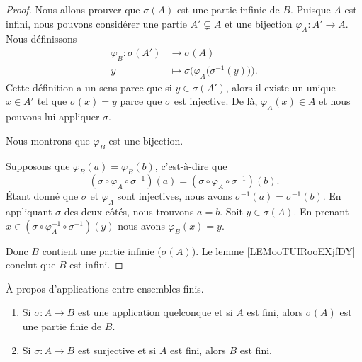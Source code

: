 \begin{proof}
	Nous allons prouver que \( \sigma(A)\) est une partie infinie de \( B\). Puisque \( A\) est infini, nous pouvons considérer une partie \( A'\subsetneq A\) et une bijection \( \varphi_A\colon A'\to A\). Nous définissons
	\begin{equation}
		\begin{aligned}
			\varphi_B\colon \sigma(A') & \to \sigma(A)                                                   \\
			y                          & \mapsto \sigma\Big( \varphi_A\big( \sigma^{-1}(y) \big)  \Big).
		\end{aligned}
	\end{equation}
	Cette définition a un sens parce que si \( y\in \sigma(A')\), alors il existe un unique \( x\in A'\) tel que \( \sigma(x)=y\) parce que \( \sigma\) est injective. De là, \( \varphi_A(x)\in A\) et nous pouvons lui appliquer \( \sigma\).

	Nous montrons que \( \varphi_B\) est une bijection.
	\begin{subproof}
		\spitem[Injective]
		Supposons que \( \varphi_B(a)=\varphi_B(b)\), c'est-à-dire que
		\begin{equation}
			(\sigma\circ\varphi_A\circ\sigma^{-1})(a)=(\sigma\circ\varphi_A\circ\sigma^{-1})(b).
		\end{equation}
		Étant donné que \( \sigma\) et \( \varphi_A\) sont injectives, nous avons \( \sigma^{-1}(a)=\sigma^{-1}(b)\). En appliquant \( \sigma\) des deux côtés, nous trouvons \( a=b\).
		\spitem[surjective]
		Soit \( y\in \sigma(A)\). En prenant \( x\in(\sigma\circ\varphi_A^{-1}\circ\sigma^{-1})(y)\) nous avons \( \varphi_B(x)=y\).
	\end{subproof}
	Donc \( B\) contient une partie infinie (\( \sigma(A)\)). Le lemme \ref{LEMooTUIRooEXjfDY} conclut que \( B\) est infini.
\end{proof}

\begin{lemma}       \label{LEMooPGPVooZzlFvf}
	À propos d'applications entre ensembles finis.
	\begin{enumerate}
		\item       \label{ITEMooNCCUooBGrtdn}
		      Si \( \sigma\colon A\to B\) est une application quelconque et si \( A\) est fini, alors \( \sigma(A)\) est une partie finie de \( B\).
		\item       \label{ITEMooKQMFooSzmXrd}
		      Si \( \sigma\colon A\to B\) est surjective et si \( A\) est fini, alors \( B\) est fini.
	\end{enumerate}
\end{lemma}

